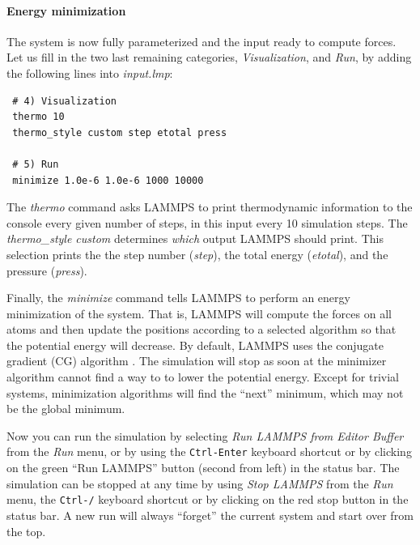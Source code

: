 \documentclass[9pt,tutorial]{livecoms}
\begin{document}
\paragraph{Energy minimization}
The system is now fully parameterized and the input ready to compute
forces.  Let us fill in the two last remaining categories,
\textit{Visualization}, and \textit{Run}, by adding the following lines
into \textit{input.lmp}:
{\normalsize
\begin{verbatim}
 # 4) Visualization
 thermo 10
 thermo_style custom step etotal press

 # 5) Run
 minimize 1.0e-6 1.0e-6 1000 10000
\end{verbatim}
}
The \textit{thermo} command asks LAMMPS to print thermodynamic
information to the console every given number of steps, in this
input every 10 simulation steps.  The \textit{thermo\_style custom} determines
\emph{which} output LAMMPS should print.  This selection prints the
the step number (\textit{step}), the total energy (\textit{etotal}), and the
pressure (\textit{press}).

Finally, the \textit{minimize} command tells LAMMPS to perform an energy
minimization of the system.  That is, LAMMPS will compute the forces on
all atoms and then update the positions according to a selected
algorithm so that the potential energy will decrease.  By default,
LAMMPS uses the conjugate gradient (CG) algorithm
\cite{hestenes1952methods}.  The simulation will stop as soon at the
minimizer algorithm cannot find a way to to lower the potential energy.
Except for trivial systems, minimization algorithms will find the
``next'' minimum, which may not be the global minimum.

Now you can run the simulation by selecting \textit{Run LAMMPS from Editor
  Buffer} from the \textit{Run} menu, or by using the
\texttt{Ctrl-Enter} keyboard shortcut or by clicking on the green ``Run
LAMMPS'' button (second from left) in the status bar.  The simulation
can be stopped at any time by using \textit{Stop LAMMPS} from the
\textit{Run} menu, the \texttt{Ctrl-/} keyboard shortcut or by clicking
on the red stop button in the status bar.  A new run will always
``forget'' the current system and start over from the top.
\end{document}
